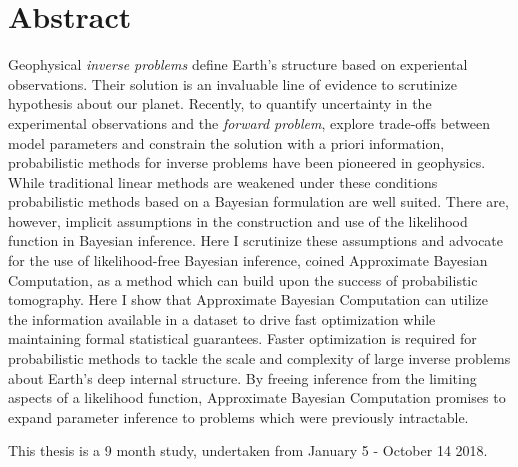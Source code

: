 \chapter{Abstract}

Geophysical \textit{inverse problems} define Earth's structure based on experiental observations. Their solution is an invaluable line of evidence to scrutinize hypothesis about our planet. Recently, to quantify uncertainty in the experimental observations and the \textit{forward problem}, explore trade-offs between model parameters and constrain the solution with a priori information, probabilistic methods for inverse problems have been pioneered in geophysics. While traditional linear methods are weakened under these conditions probabilistic methods based on a Bayesian formulation are well suited.  There are, however, implicit assumptions in the construction and use of the likelihood function in Bayesian inference. Here I scrutinize these assumptions and advocate for the use of likelihood-free Bayesian inference, coined Approximate Bayesian Computation, as a method which can build upon the success of probabilistic tomography. Here I show that Approximate Bayesian Computation can utilize the information available in a dataset to drive fast optimization while maintaining formal statistical guarantees. Faster optimization is required for probabilistic methods to tackle the scale and complexity of large inverse problems about Earth’s deep internal structure. By freeing inference from the limiting aspects of a likelihood function, Approximate Bayesian Computation promises to expand parameter inference to problems which were previously intractable. \par
This thesis is a 9 month study, undertaken from January 5 - October 14 2018. 
